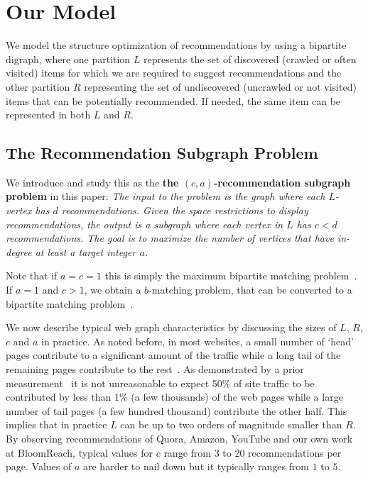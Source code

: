 \section{Our Model}

We model the structure optimization of recommendations by using a bipartite
digraph, where one partition $L$ represents the set of discovered (crawled or often visited) items for which
we are required to suggest recommendations and the other partition $R$
representing the set of undiscovered (uncrawled or not visited) items that can be potentially recommended. If
needed, the same item can be represented in both $L$ and $R$. 
\vs

\subsection{The Recommendation Subgraph Problem} 
We introduce and study this as the {\bf the $(c, a)$-recommendation subgraph problem} in this paper:
{\em
 The input to the problem is the graph where each
$L$-vertex has $d$ recommendations. Given the space restrictions to
display recommendations, the output is a subgraph where each vertex in
$L$ has $c < d$ recommendations. The goal is to maximize the number of
vertices that have in-degree at least a target integer $a$.
} 

\vs

Note that if $a=c=1$ this is simply the maximum bipartite
matching problem~\cite{LovaszPlummer1986}. If $a=1$ and $c > 1$, we
obtain a $b$-matching problem, that can be converted to a bipartite
matching problem~\cite{Gabow1983}.\vs

We now describe typical web graph characteristics by discussing the sizes of $L$, $R$, $c$ and $a$ in practice. As noted before, in most websites, a small number of `head' pages contribute to a significant amount of the traffic while a long tail of the remaining pages contribute to the rest~\cite{HubermanAdamic1999,
  DuDemmerBrewer2006}. As demonstrated by a prior
measurement~\cite{KumarNorrisSun2009} it is not unreasonable to expect
50\% of site traffic to be contributed by less than 1\% (a few
thousands) of the web pages while a large number of tail pages (a few
hundred thousand) contribute the other half. This implies that in
practice $L$ can be up to two orders of magnitude smaller than $R$.
By observing recommendations of Quora, Amazon, YouTube and our own
work at BloomReach, typical values for $c$ range from 3 to 20 recommendations per
page. Values of $a$ are harder to nail down but it typically ranges
from $1$ to $5$. \vs

